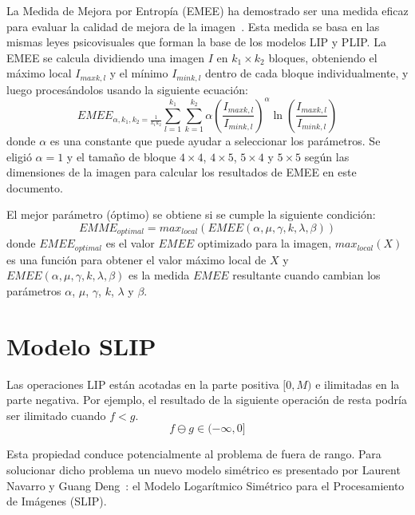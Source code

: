 La Medida de Mejora por Entropía (EMEE) ha demostrado ser una medida eficaz para evaluar la calidad de mejora de la imagen~\cite{agaian2000new}. Esta medida se basa en las mismas leyes psicovisuales que forman la base de
los modelos LIP y PLIP. La EMEE se calcula dividiendo una imagen $I$ en $k_1 \times k_2$ bloques, obteniendo el máximo local $I_{max k,l}$ y el mínimo $I_{min k,l}$ dentro de cada bloque individualmente, y luego procesándolos usando la siguiente ecuación:
\begin{equation}
	\displaystyle EMEE_{\alpha,k_1,k_2=\frac{1}{k_1k_2}}\sum_{l=1}^{k_1}\sum_{k=1}^{k_2}\alpha\left(\frac{I_{max k,l}}{I_{min k,l}}\right)^\alpha\ln\left(\frac{I_{max k,l}}{I_{min k,l}}\right)
\end{equation}
donde $\alpha$ es una constante que puede ayudar a seleccionar los parámetros. Se eligi\'o $\alpha = 1$ y el tamaño de bloque $4 \times 4$, $4 \times 5$, $5 \times 4$ y $5 \times 5$ seg\'un las dimensiones de la imagen para calcular los resultados de EMEE en este documento.

El mejor parámetro (óptimo) se obtiene si se cumple la siguiente condición:
\begin{equation}
	EMME_{optimal}=max_{local}(EMEE(\alpha, \mu, \gamma, k, \lambda, \beta))
\end{equation}
donde $EMEE_{optimal}$ es el valor $EMEE$ optimizado para la imagen, $max_{local}(X)$ es una función para obtener el valor máximo local de $X$ y $EMEE(\alpha, \mu, \gamma, k, \lambda, \beta)$ es la medida $EMEE$ resultante cuando cambian los parámetros $\alpha$, $\mu$, $\gamma$, $k$, $\lambda$ y $\beta$.

\section{Modelo SLIP}

Las operaciones LIP están acotadas en la parte positiva $[0, M )$ e ilimitadas en la parte negativa. Por ejemplo, el resultado de la siguiente operación de resta podría ser ilimitado cuando $f < g$.
\begin{equation}
	f \ominus g \in (-\infty,0]
\end{equation}

Esta propiedad conduce potencialmente al problema de fuera de rango. Para solucionar dicho problema un nuevo modelo sim\'etrico es presentado por Laurent Navarro y Guang Deng~\cite{navarro2013symmetric}: el Modelo Logar\'itmico Sim\'etrico para el Procesamiento de Im\'agenes (SLIP). 

